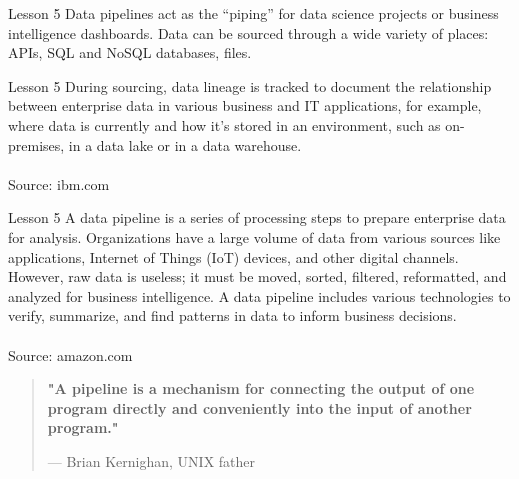 \documentclass[aspectratio=1610]{beamer}
\begin{document}
\begin{frame}{Lesson 5}{}
\LARGE
Data pipelines act as the “piping” for data science projects or 
business intelligence dashboards. Data can be sourced through a wide 
variety of places: APIs, SQL and NoSQL databases, files.
\end{frame}

\begin{frame}{Lesson 5}{}
\LARGE
During sourcing, data lineage is tracked to document the relationship 
between enterprise data in various business and IT applications, for 
example, where data is currently and how it’s stored in an 
environment, such as on-premises, in a data lake or in a data 
warehouse.\\~\\
Source: ibm.com
\end{frame}


\begin{frame}{Lesson 5}{}
\LARGE
A data pipeline is a series of processing steps to prepare enterprise 
data for analysis. Organizations have a large volume of data from 
various sources like applications, Internet of Things (IoT) devices, 
and other digital channels. However, raw data is useless; it must be 
moved, sorted, filtered, reformatted, and analyzed for business 
intelligence. A data pipeline includes various technologies to 
verify, summarize, and find patterns in data to inform business 
decisions.\\~\\
Source: amazon.com
\end{frame}


\begin{frame}
\end{frame}



\begin{frame}
\begin{center}
\Huge
\begin{quote}
\textbf{"A pipeline is a mechanism for connecting the output of one program directly and conveniently into the 
    input of another program."}
\begin{flushright}
{--- Brian Kernighan, UNIX father}	
\end{flushright}
\end{quote}
\end{center}
\end{frame}
\end{document}
